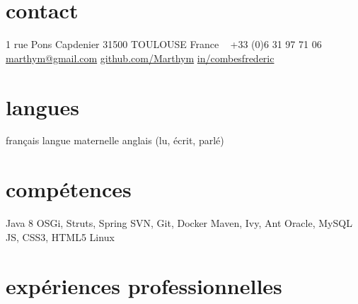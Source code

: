 \documentclass{friggeri-cv} 	%
\begin{document}


\begin{aside} %
\section{contact}
1 rue Pons Capdenier
31500 TOULOUSE
France
~
+33 (0)6 31 97 71 06
\href{mailto:marthym@gmail.com}{marthym@gmail.com}
\href{https://github.com/Marthym}{github.com/Marthym}
\href{https://www.linkedin.com/in/combesfrederic}{in/combesfrederic}
\section{langues}
français langue maternelle
anglais (lu, écrit, parlé)
\section{compétences}
Java 8
OSGi, Struts, Spring
SVN, Git, Docker
Maven, Ivy, Ant
Oracle, MySQL
JS, CSS3, HTML5
Linux
\end{aside}

\section{expériences professionnelles}
\end{document}
